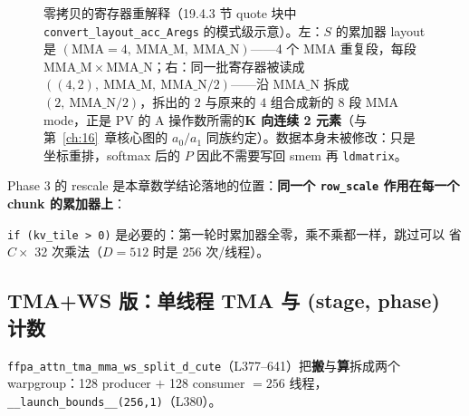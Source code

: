 \begin{figure}[H]
\caption{零拷贝的寄存器重解释（19.4.3 节 quote 块中 \texttt{convert\_layout\_acc\_Aregs} 的模式级示意）。左：$S$ 的累加器 layout 是 $(\mathrm{MMA}{=}4,\ \mathrm{MMA\_M},\ \mathrm{MMA\_N})$——4 个 MMA 重复段，每段 $\mathrm{MMA\_M}\times\mathrm{MMA\_N}$；右：同一批寄存器被读成 $((4,2),\ \mathrm{MMA\_M},\ \mathrm{MMA\_N}/2)$——沿 $\mathrm{MMA\_N}$ 拆成 $(2,\ \mathrm{MMA\_N}/2)$，拆出的 $2$ 与原来的 $4$ 组合成新的 $8$ 段 MMA mode，正是 PV 的 A 操作数所需的\textbf{K 向连续 2 元素}（与第~\ref{ch:16}~章核心图的 $a_0/a_1$ 同族约定）。数据本身未被修改：只是坐标重排，softmax 后的 $P$ 因此不需要写回 smem 再 \texttt{ldmatrix}。}
\label{fig:19-aregs-reinterpret}
\end{figure}

Phase 3 的 rescale 是本章数学结论落地的位置：\textbf{同一个 \texttt{row\_scale}
作用在每一个 chunk 的累加器上}：



\texttt{if (kv\_tile > 0)} 是必要的：第一轮时累加器全零，乘不乘都一样，跳过可以
省 $C \times$ 32 次乘法（$D=512$ 时是 256 次/线程）。

\subsection{TMA+WS 版：单线程 TMA 与 (stage, phase) 计数}

\texttt{ffpa\_\allowbreak{}attn\_\allowbreak{}tma\_\allowbreak{}mma\_\allowbreak{}ws\_\allowbreak{}split\_\allowbreak{}d\_\allowbreak{}cute}（L377--641）把\textbf{搬}与\textbf{算}拆成两个
warpgroup：128 producer $+$ 128 consumer $= 256$ 线程，
\texttt{\_\allowbreak{}\_\allowbreak{}launch\_\allowbreak{}bounds\_\allowbreak{}\_\allowbreak{}(256,\allowbreak{}1)}（L380）。

